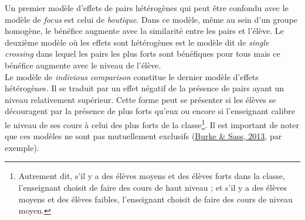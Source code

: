 \documentclass[
]{book}
\begin{document}
Un premier modèle d'effets de pairs hétérogènes qui peut être confondu avec le modèle de \emph{focus} est celui de \emph{boutique}. Dans ce modèle, même au sein d'un groupe homogène, le bénéfice augmente avec la similarité entre les pairs et l'élève.
Le deuxième modèle où les effets sont hétérogènes est le modèle dit de \emph{single crossing} dans lequel les pairs les plus forts sont bénéfiques pour tous mais ce bénéfice augmente avec le niveau de l'élève.\\
Le modèle de \emph{indivious comparison} constitue le dernier modèle d'effets hétérogènes. Il se traduit par un effet négatif de la présence de pairs ayant un niveau relativement supérieur. Cette forme peut se présenter si les élèves se découragent par la présence de plus forts qu'eux ou encore si l'enseignant calibre le niveau de ses cours à celui des plus forts de la classe\footnote{Autrement dit, s'il y a des élèves moyens et des élèves forts dans la classe, l'enseignant choisit de faire des cours de haut niveau ; et s'il y a des élèves moyens et des élèves faibles, l'enseignant choisit de faire des cours de niveau moyen.}.
Il est important de noter que ces modèles ne sont pas mutuellement exclusifs (\protect\hyperlink{ref-BUR:SAS:13}{Burke \& Sass, 2013}, par exemple).
\end{document}
